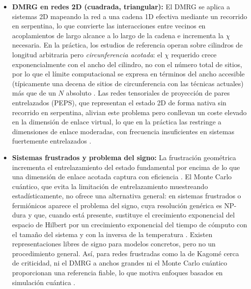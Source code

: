 \documentclass[11pt,a4paper,spanish]{book}
\begin{document}
\begin{itemize}
    \item \textbf{DMRG en redes 2D (cuadrada, triangular):} El DMRG se aplica a sistemas 2D mapeando la red a una cadena 1D efectiva mediante un recorrido en serpentina, lo que convierte las interacciones entre vecinos en acoplamientos de largo alcance a lo largo de la cadena e incrementa la $\chi$ necesaria. En la práctica, los estudios de referencia operan sobre cilindros de longitud arbitraria pero \emph{circunferencia acotada}: el $\chi$ requerido crece exponencialmente con el ancho del cilindro, no con el número total de sitios, por lo que el límite computacional se expresa en términos del ancho accesible (típicamente una decena de sitios de circunferencia con las técnicas actuales) más que de un $N$ absoluto \citep{schollwock2011}. Las redes tensoriales de proyección de pares entrelazados (PEPS), que representan el estado 2D de forma nativa sin recorrido en serpentina, alivian este problema pero conllevan un coste elevado en la dimensión de enlace virtual, lo que en la práctica las restringe a dimensiones de enlace moderadas, con frecuencia insuficientes en sistemas fuertemente entrelazados \citep{schollwock2011}.

    \item \textbf{Sistemas frustrados y problema del signo:} La frustración geométrica incrementa el entrelazamiento del estado fundamental por encima de lo que una dimensión de enlace acotada captura con eficiencia \citep{schollwock2011}. El Monte Carlo cuántico, que evita la limitación de entrelazamiento muestreando estadísticamente, no ofrece una alternativa general: en sistemas frustrados o fermiónicos aparece el problema del signo, cuya resolución genérica es NP-dura y que, cuando está presente, sustituye el crecimiento exponencial del espacio de Hilbert por un crecimiento exponencial del tiempo de cómputo con el tamaño del sistema y con la inversa de la temperatura \citep{troyer2005}. Existen representaciones libres de signo para modelos concretos, pero no un procedimiento general. Así, para redes frustradas como la de Kagomé cerca de criticidad, ni el DMRG a anchos grandes ni el Monte Carlo cuántico proporcionan una referencia fiable, lo que motiva enfoques basados en simulación cuántica \citep{ahsan2025}.
\end{itemize}
\end{document}
